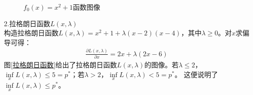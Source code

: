 \documentclass[12pt,a4paper]{ctexart}
\begin{document}
\begin{itemize}
\begin{figure}[!h]
        \caption{$f_0(x)=x^2+1$函数图像}
        \label{f_0(x)} %
    \end{figure}
    2.拉格朗日函数$L(x,\lambda)$\\
    构造拉格朗日函数$L(x,\lambda)=x^2+1+\lambda(x-2)(x-4)$，其中$\lambda \geq 0$。对$x$求偏导可得：
    \begin{align}
    \frac{\partial{L(x,\lambda)}}{\partial x}=2x+\lambda(2x-6) 
    \label{qiudao}
    \end{align}
    图\ref{拉格朗日函数}给出了拉格朗日函数$L(x,\lambda)$的图像。若$\lambda \leq 2$，
    $\inf\limits_{x} L(x,\lambda) \leq 5=p^*$；若$\lambda > 2$，$\inf\limits_{x} L(x,\lambda) < 5=p^*$。
    这便说明了$\inf\limits_{x} L(x,\lambda) \leq p^*$。\\
    \begin{figure}[!h]
        \centering

\end{figure}
\end{itemize}
\end{document}
